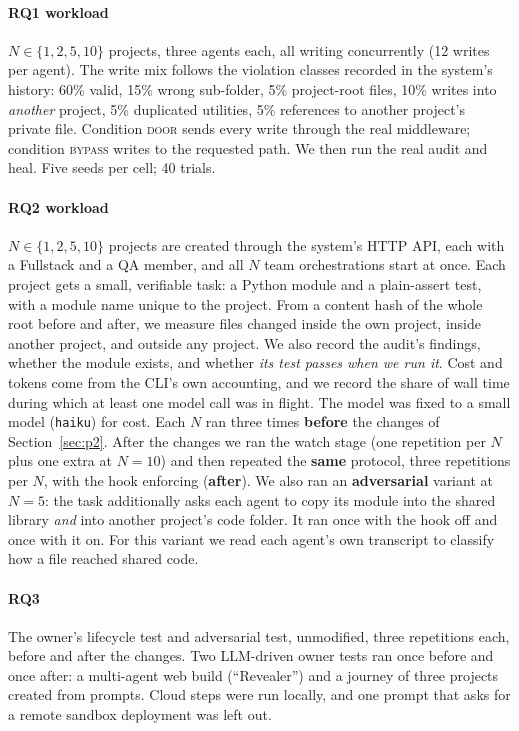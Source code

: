 \paragraph*{RQ1 workload} $N\in\{1,2,5,10\}$ projects, three agents each, all writing concurrently (12 writes per agent). The write mix follows the violation classes recorded in the system's history: 60\% valid, 15\% wrong sub-folder, 5\% project-root files, 10\% writes into \emph{another} project, 5\% duplicated utilities, 5\% references to another project's private file. Condition \textsc{door} sends every write through the real middleware; condition \textsc{bypass} writes to the requested path. We then run the real audit and heal. Five seeds per cell; 40 trials.

\paragraph*{RQ2 workload} $N\in\{1,2,5,10\}$ projects are created through the system's HTTP API, each with a Fullstack and a QA member, and all $N$ team orchestrations start at once. Each project gets a small, verifiable task: a Python module and a plain-assert test, with a module name unique to the project. From a content hash of the whole root before and after, we measure files changed inside the own project, inside another project, and outside any project. We also record the audit's findings, whether the module exists, and whether \emph{its test passes when we run it}. Cost and tokens come from the CLI's own accounting, and we record the share of wall time during which at least one model call was in flight. The model was fixed to a small model (\texttt{haiku}) for cost. Each $N$ ran three times \textbf{before} the changes of Section~\ref{sec:p2}. After the changes we ran the watch stage (one repetition per $N$ plus one extra at $N=10$) and then repeated the \textbf{same} protocol, three repetitions per $N$, with the hook enforcing (\textbf{after}). We also ran an \textbf{adversarial} variant at $N=5$: the task additionally asks each agent to copy its module into the shared library \emph{and} into another project's code folder. It ran once with the hook off and once with it on. For this variant we read each agent's own transcript to classify how a file reached shared code.

\paragraph*{RQ3} The owner's lifecycle test and adversarial test, unmodified, three repetitions each, before and after the changes. Two LLM-driven owner tests ran once before and once after: a multi-agent web build (``Revealer'') and a journey of three projects created from prompts. Cloud steps were run locally, and one prompt that asks for a remote sandbox deployment was left out.

